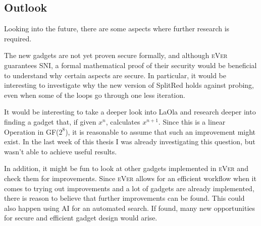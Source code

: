 \documentclass[english, version-2020-11]{uzl-thesis}
\newcommand{\toolname}[1]{\textsc{#1}}
\begin{document}
  
  
  \subsection{Outlook}
  Looking into the future, there are some aspects where further research is required. 
  
  The new gadgets are not yet proven secure formally, and although \toolname{eVer} guarantees SNI, a formal mathematical proof of their security would be beneficial to understand why certain aspects are secure. In particular, it would be interesting to investigate why the new version of SplitRed holds against probing, even when some of the loops go through one less iteration.


  It would be interesting to take a deeper look into LaOla and research deeper into finding a gadget that, if given $x^n$, calculates $x^{n+1}$. Since this is a linear Operation in GF($2^8$), it is reasonable to assume that such an improvement might exist. In the last week of this thesis I was already investigating this question, but wasn't able to achieve useful results.

  In addition, it might be fun to look at other gadgets implemented in \toolname{eVer} and check them for improvements. Since \toolname{eVer} allows for an efficient workflow when it comes to trying out improvements and a lot of gadgets are already implemented, there is reason to believe that further improvements can be found. This could also happen using AI for an automated search. If found, many new opportunities for secure and efficient gadget design would arise. 
\end{document}
